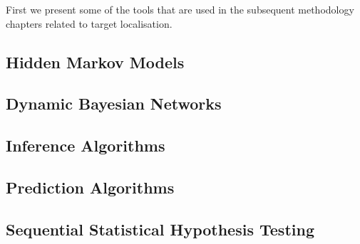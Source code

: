 

First we present some of the tools that are used in the subsequent methodology chapters related to target localisation. 


\subsection{Hidden Markov Models}\label{subsec:BGHMM}


\subsection{Dynamic Bayesian Networks}\label{subsec:BGDBN}


\subsection{Inference Algorithms}\label{subsec:BGInfAlgos}


\subsection{Prediction Algorithms}


\subsection{Sequential Statistical Hypothesis Testing}\label{subsec:SPRT}


%